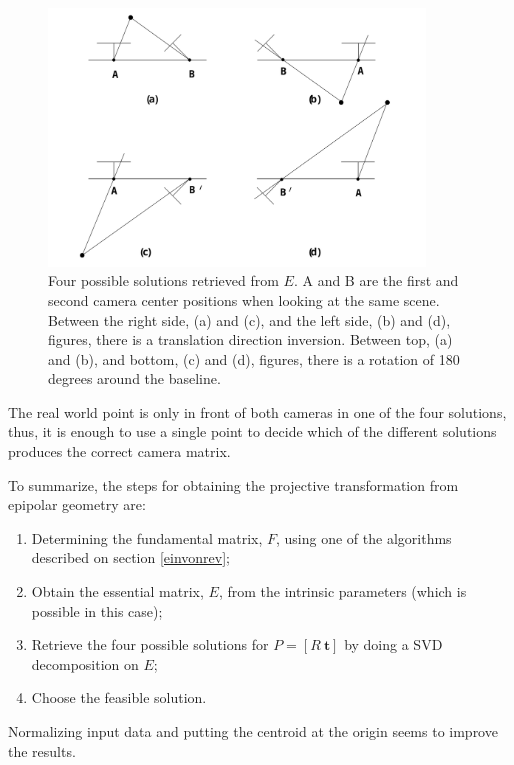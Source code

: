 \begin{figure}[ht]
	\centering
	\includegraphics[width=10cm]{images/ep4sols.png}
	\caption[Four possible solutions retrieved from $E$]{Four possible solutions retrieved from $E$. A and B are the first and second camera center positions when looking at the same scene. Between the right side, (a) and (c), and the left side, (b) and (d), figures, there is a translation direction inversion. Between top, (a) and (b), and bottom, (c) and (d), figures, there is a rotation of 180 degrees around the baseline. \cite{epipolar}}
	\label{sec2:fig:ep4}
\end{figure}
The real world point is only in front of both cameras in one of the four solutions, thus, it is enough to use a single point to decide which of the different solutions produces the correct camera matrix. \cite{epipolar}

To summarize, the steps for obtaining the projective transformation from epipolar geometry are:
\begin{enumerate}
	\item Determining the fundamental matrix, $F$, using one of the algorithms described on section \ref{einvonrev};
	\item Obtain the essential matrix, $E$, from the intrinsic parameters (which is possible in this case);
	\item Retrieve the four possible solutions for $P = [R \ \mathbf{t}]$ by doing a SVD decomposition on $E$;
	\item Choose the feasible solution.
\end{enumerate}

Normalizing input data and putting the centroid at the origin seems to improve the results.

